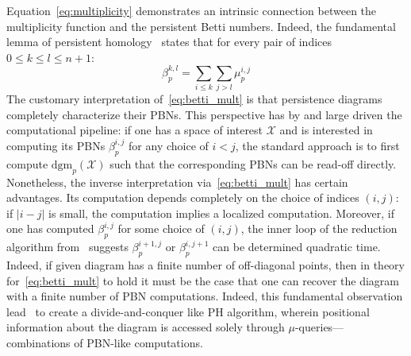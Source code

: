 Equation~\eqref{eq:multiplicity} demonstrates an intrinsic connection between the multiplicity function and the persistent Betti numbers. Indeed, the fundamental lemma of persistent homology~\cite{edelsbrunner2022computational} states that for every pair of indices $0 \leq k \leq l \leq n+1$: 
\begin{equation}\label{eq:betti_mult}
	\beta_p^{k,l} = \sum\limits_{i \leq k} \sum\limits_{j > l} \mu_p^{i,j}
\end{equation}
The customary interpretation of~\eqref{eq:betti_mult} is that persistence diagrams completely characterize their PBNs. This perspective has by and large driven the computational pipeline: if one has a space of interest $\mathcal{X}$ and is interested in computing its PBNs $\beta_p^{i,j}$ for any choice of $i < j$, the standard approach is to first compute $\mathrm{dgm}_p(\mathcal{X})$ such that the corresponding PBNs can be read-off directly.
Nonetheless, the inverse interpretation via~\eqref{eq:betti_mult} has certain advantages. Its computation depends completely on the choice of indices $(i,j)$: if $\lvert i - j \rvert$ is small, the computation implies a localized computation. Moreover, if one has computed $\beta_p^{i,j}$ for some choice of $(i,j)$, the inner loop of the reduction algorithm from~\cite{edelsbrunner2022computational} suggests  $\beta_p^{i+1,j}$ or $\beta_p^{i,j+1}$ can be determined quadratic time. 
Indeed, if given diagram has a finite number of off-diagonal points, then in theory for~\eqref{eq:betti_mult} to hold it must be the case that one can recover the diagram with a finite number of PBN computations. 
Indeed, this fundamental observation lead~\cite{chen2011output} to create a divide-and-conquer like PH algorithm, wherein positional information about the diagram is accessed solely through $\mu$-queries---combinations of PBN-like computations.

